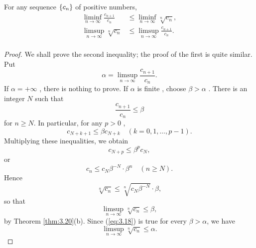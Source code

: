 \begin{thm}
    \label{thm:3.37}
    For any sequence $\protect\{c_n\}$ of positive numbers,
    \begin{align*}
        \liminf_{n \to \infty} \frac{c_{n+1}}{c_n} &\leq 
        \liminf_{n \to \infty} \sqrt[n]{c_n}, \\
        \limsup_{n \to \infty} \sqrt[n]{c_n} &\leq
        \limsup_{n \to \infty} \frac{c_{n+1}}{c_n}. \\
    \end{align*} 
\end{thm}

\begin{proof}
    We shall prove the second inequality;
    the proof of the first is quite similar.
    Put
    \begin{equation*}
        \alpha = \limsup_{n \to \infty} \frac{c_{n+1}}{c_n}.
    \end{equation*}
    If $\alpha = +\infty$ , there is nothing to prove.
    If $\alpha$ is finite , choose $\beta > \alpha$ .
    There is an integer $N$ such that
    \begin{equation*}
        \frac{c_{n+1}}{c_n} \leq \beta
    \end{equation*}
    for $n \geq N$. In particular, for any $p > 0$ ,
    \begin{equation*}
        c_{N+k+1} \leq \beta c_{N+k} \quad
        (k=0,1,\dots,p-1).
    \end{equation*} 
    Multiplying these inequalities, we obtain
    \begin{equation*}
        c_{N+p} \leq \beta^p c_N,
    \end{equation*}
    or
    \begin{equation*}
        c_n \leq c_N \beta^{-N}\cdot \beta^n \quad (n \geq N).
    \end{equation*}
    Hence
    \begin{equation*}
        \sqrt[n]{c_n} \leq
        \sqrt[n]{c_N \beta^{-N}}\cdot \beta,
    \end{equation*}
    so that
    \begin{equation}
        \label{eq:3.18}
        \limsup_{n \to \infty} \sqrt[n]{c_n} \leq \beta,
    \end{equation}
    by Theorem \ref{thm:3.20}(b).
    Since (\ref{eq:3.18}) is true for every $\beta > \alpha$, we have
    \begin{equation*}
        \limsup_{n \to \infty} 
        \sqrt[n]{c_n} \leq \alpha.
    \end{equation*}
\end{proof}